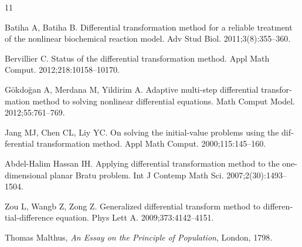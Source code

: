 \begin{thebibliography}{11}
	\begin{otherlanguage}{english}
		 Batiha A, Batiha B. Differential transformation method for a reliable treatment of the nonlinear biochemical reaction model. Adv Stud Biol. 2011;3(8):355--360.
		
		 Bervillier C. Status of the differential transformation method. Appl Math Comput. 2012;218:10158--10170.
		
		 Gökdoğan A, Merdana M, Yildirim A. Adaptive multi-step differential transformation method to solving nonlinear differential equations. Math Comput Model. 2012;55:761--769.
		
		 Jang MJ, Chen CL, Liy YC. On solving the initial-value problems using the differential transformation method. Appl Math Comput. 2000;115:145--160.
		
		 Abdel-Halim Hassan IH. Applying differential transformation method to the one-dimensional planar Bratu problem. Int J Contemp Math Sci. 2007;2(30):1493--1504.
		
		 Zou L, Wangb Z, Zong Z. Generalized differential transform method to differential-difference equation. Phys Lett A. 2009;373:4142--4151.
		
		Thomas Malthus,
		\textit{An Essay on the Principle of Population},
		London, 1798.
	\end{otherlanguage}
	
\end{thebibliography}